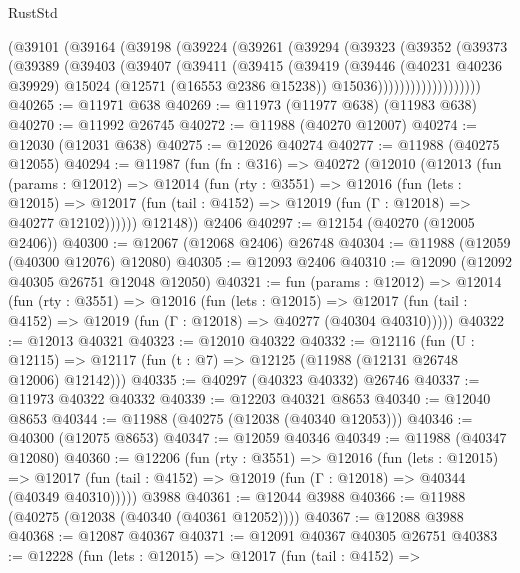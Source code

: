 \begin{lexlean}{RustStd}
\begin{coremodule}
          (@39101
            (@39164
              (@39198
                (@39224
                  (@39261
                    (@39294
                      (@39323
                        (@39352
                          (@39373
                            (@39389
                              (@39403
                                (@39407
                                  (@39411
                                    (@39415
                                      (@39419
                                        (@39446
                                          (@40231 @40236 @39929)
                                          @15024
                                          (@12571 (@16553 @2386 @15238))
                                          @15036)))))))))))))))))))
@40265 := @11971 @638
@40269 := @11973 (@11977 @638) (@11983 @638)
@40270 := @11992 @26745
@40272 := @11988 (@40270 @12007)
@40274 := @12030 (@12031 @638)
@40275 := @12026 @40274
@40277 := @11988 (@40275 @12055)
@40294 := @11987
    (fun (fn : @316) =>
    @40272
      (@12010
        (@12013
          (fun (params : @12012) =>
          @12014
            (fun (rty : @3551) =>
            @12016
              (fun (lets : @12015) =>
              @12017 (fun (tail : @4152) => @12019 (fun (Γ : @12018) => @40277 @12102))))))
        @12148))
    @2406
@40297 := @12154 (@40270 (@12005 @2406))
@40300 := @12067 (@12068 @2406) @26748
@40304 := @11988 (@12059 (@40300 @12076) @12080)
@40305 := @12093 @2406
@40310 := @12090 (@12092 @40305 @26751 @12048 @12050)
@40321 := fun (params : @12012) =>
  @12014
    (fun (rty : @3551) =>
    @12016
      (fun (lets : @12015) =>
      @12017 (fun (tail : @4152) => @12019 (fun (Γ : @12018) => @40277 (@40304 @40310)))))
@40322 := @12013 @40321
@40323 := @12010 @40322
@40332 := @12116
    (fun (U : @12115) => @12117 (fun (t : @7) => @12125 (@11988 (@12131 @26748 @12006) @12142)))
@40335 := @40297 (@40323 @40332) @26746
@40337 := @11973 @40322 @40332
@40339 := @12203 @40321 @8653
@40340 := @12040 @8653
@40344 := @11988 (@40275 (@12038 (@40340 @12053)))
@40346 := @40300 (@12075 @8653)
@40347 := @12059 @40346
@40349 := @11988 (@40347 @12080)
@40360 := @12206
    (fun (rty : @3551) =>
    @12016
      (fun (lets : @12015) =>
      @12017 (fun (tail : @4152) => @12019 (fun (Γ : @12018) => @40344 (@40349 @40310)))))
    @3988
@40361 := @12044 @3988
@40366 := @11988 (@40275 (@12038 (@40340 (@40361 @12052))))
@40367 := @12088 @3988
@40368 := @12087 @40367
@40371 := @12091 @40367 @40305 @26751
@40383 := @12228
    (fun (lets : @12015) =>
    @12017
      (fun (tail : @4152) =>

\end{coremodule}
\end{lexlean}

